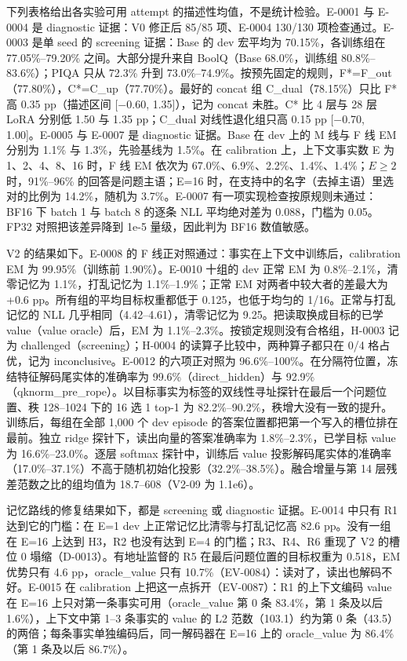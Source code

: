 \documentclass[11pt]{article}
\begin{document}
下列表格给出各实验可用 attempt 的描述性均值，不是统计检验。E-0001 与 E-0004 是 diagnostic 证据：V0 修正后 85/85 项、E-0004 130/130 项检查通过。E-0003 是单 seed 的 screening 证据：Base 的 dev 宏平均为 70.15\%，各训练组在 77.05\%--79.20\% 之间。大部分提升来自 BoolQ（Base 68.0\%，训练组 80.8\%--83.6\%）；PIQA 只从 72.3\% 升到 73.0\%--74.9\%。按预先固定的规则，F*=F\_out（77.80\%），C*=C\_up（77.70\%）。最好的 concat 组 C\_dual（78.15\%）只比 F* 高 0.35 pp（描述区间 [$-$0.60, 1.35]），记为 concat 未胜。C* 比 4 层与 28 层 LoRA 分别低 1.50 与 1.35 pp；C\_dual 对线性退化组只高 0.15 pp [$-$0.70, 1.00]。E-0005 与 E-0007 是 diagnostic 证据。Base 在 dev 上的 M 线与 F 线 EM 分别为 1.1\% 与 1.3\%，先验基线为 1.5\%。在 calibration 上，上下文事实数 E 为 1、2、4、8、16 时，F 线 EM 依次为 67.0\%、6.9\%、2.2\%、1.4\%、1.4\%；$E\geq 2$ 时，91\%--96\% 的回答是问题主语；E=16 时，在支持中的名字（去掉主语）里选对的比例为 14.2\%，随机为 3.7\%。E-0007 有一项实现检查按原规则未通过：BF16 下 batch 1 与 batch 8 的逐条 NLL 平均绝对差为 0.088，门槛为 0.05。FP32 对照把该差异降到 1e-5 量级，因此判为 BF16 数值敏感。

V2 的结果如下。E-0008 的 F 线正对照通过：事实在上下文中训练后，calibration EM 为 99.95\%（训练前 1.90\%）。E-0010 十组的 dev 正常 EM 为 0.8\%--2.1\%，清零记忆为 1.1\%，打乱记忆为 1.1\%--1.9\%；正常 EM 对两者中较大者的差最大为 +0.6 pp。所有组的平均目标权重都低于 0.125，也低于均匀的 1/16。正常与打乱记忆的 NLL 几乎相同（4.42--4.61），清零记忆为 9.25。把读取换成目标的已学 value（value oracle）后，EM 为 1.1\%--2.3\%。按锁定规则没有合格组，H-0003 记为 challenged（screening）；H-0004 的读算子比较中，两种算子都只在 0/4 格占优，记为 inconclusive。E-0012 的六项正对照为 96.6\%--100\%。在分隔符位置，冻结特征解码尾实体的准确率为 99.6\%（direct\_hidden）与 92.9\%（qknorm\_pre\_rope）。以目标事实为标签的双线性寻址探针在最后一个问题位置、秩 128--1024 下的 16 选 1 top-1 为 82.2\%--90.2\%，秩增大没有一致的提升。训练后，每组在全部 1,000 个 dev episode 的答案位置都把第一个写入的槽位排在最前。独立 ridge 探针下，读出向量的答案准确率为 1.8\%--2.3\%，已学目标 value 为 16.6\%--23.0\%。逐层 softmax 探针中，训练后 value 投影解码尾实体的准确率（17.0\%--37.1\%）不高于随机初始化投影（32.2\%--38.5\%）。融合增量与第 14 层残差范数之比的组均值为 18.7--608（V2-09 为 1.1e6）。

记忆路线的修复结果如下，都是 screening 或 diagnostic 证据。E-0014 中只有 R1 达到它的门槛：在 E=1 dev 上正常记忆比清零与打乱记忆高 82.6 pp。没有一组在 E=16 上达到 H3，R2 也没有达到 E=4 的门槛；R3、R4、R6 重现了 V2 的槽位 0 塌缩（D-0013）。有地址监督的 R5 在最后问题位置的目标权重为 0.518，EM 优势只有 4.6 pp，oracle\_value 只有 10.7\%（EV-0084）：读对了，读出也解码不好。E-0015 在 calibration 上把这一点拆开（EV-0087）：R1 的上下文编码 value 在 E=16 上只对第一条事实可用（oracle\_value 第 0 条 83.4\%，第 1 条及以后 1.6\%），上下文中第 1--3 条事实的 value 的 L2 范数（103.1）约为第 0 条（43.5）的两倍；每条事实单独编码后，同一解码器在 E=16 上的 oracle\_value 为 86.4\%（第 1 条及以后 86.7\%）。
\end{document}

